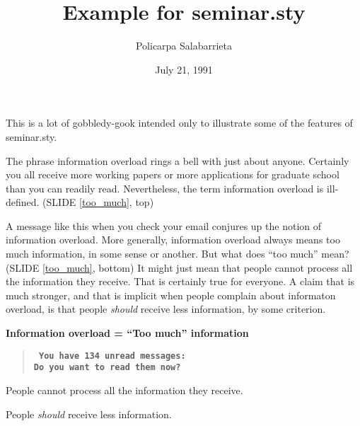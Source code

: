 \documentclass[%
  slidesonly,%
  semlayer%
  ]{seminar}                                  %
\title{Example for seminar.sty}
\author{Policarpa Salabarrieta}
\date{July 21, 1991}
\newcommand{\sref}[1]{SLIDE \ref{#1}}
\begin{document}
\maketitle          %

\begin{slide}
  \ifslidesonly              %
    \maketitle
    \addtocounter{slide}{-1}
  \fi
\end{slide}

This is a lot of gobbledy-gook intended only to illustrate some of the
features of seminar.sty.

 The phrase information overload rings a bell with just about anyone.
Certainly you all receive more working papers or more applications for
graduate school than you can readily read. Nevertheless, the term information
overload is ill-defined. (\sref{too_much}, top)

 A message like this when you check your email conjures up the notion of
information overload. More generally, information overload always means too
much information, in some sense or another. But what does ``too much'' mean?
(\sref{too_much}, bottom) It might just mean that people cannot process all
the information they receive. That is certainly true for everyone. A claim
that is much stronger, and that is implicit when people complain about
informaton overload, is that people {\em should} receive less information, by
some criterion.

\begin{slide}\label{too_much}%
\begin{center}
  \large\bf
 Information overload = ``Too much'' information
\end{center}
\smallskip

\begin{verse} \bf\tt
  You have 134 unread messages:\\
  Do you want to read them now?
\end{verse}

\begin{enumerate}
  {
  \item People { cannot process all} the information they receive.}
  \item People {\em should} receive less information.
 \end{enumerate}
\end{slide}
\end{document}
